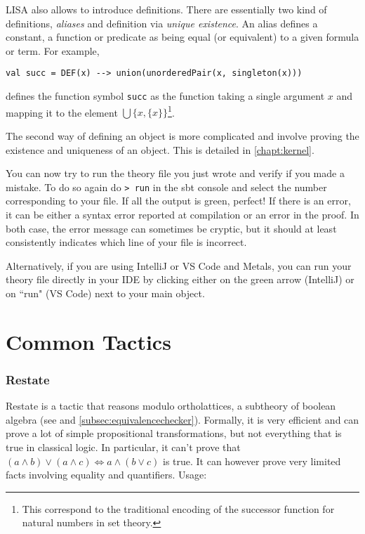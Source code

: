 LISA also allows to introduce definitions. There are essentially two kind of definitions, \emph{aliases} and definition via \emph{unique existence}.
An alias defines a constant, a function or predicate as being equal (or equivalent) to a given formula or term. For example,

\noindent\begin{minipage}{\linewidth}\vspace{1em}
  \begin{lstlisting}[language=lisa, frame=single]
  val succ = DEF(x) --> union(unorderedPair(x, singleton(x)))
  \end{lstlisting}
\end{minipage}
defines the function symbol \lstinline|succ| as the function taking a single argument $x$ and mapping it to the element $\bigcup \lbrace x, \lbrace x \rbrace \rbrace$\footnote{This correspond to the traditional encoding of the successor function for natural numbers in set theory.}.

The second way of defining an object is more complicated and involve proving the existence and uniqueness of an object. This is detailed in \autoref{chapt:kernel}.

You can now try to run the theory file you just wrote and verify if you made a mistake. To do so again do \lstinline|> run| in the sbt console and select the number corresponding to your file. 
If all the output is green, perfect! If there is an error, it can be either a syntax error reported at compilation or an error in the proof. In both case, the error message can sometimes be cryptic, but it should at least consistently indicates which line of your file is incorrect.

Alternatively, if you are using IntelliJ or VS Code and Metals, you can run your theory file directly in your IDE by clicking either on the green arrow (IntelliJ) or on ``run" (VS Code) next to your main object.


\section{Common Tactics}
\subsubsection*{Restate}
Restate is a tactic that reasons modulo ortholattices, a subtheory of boolean algebra (see \cite{guilloudFormulaNormalizationsVerification2023} and \autoref{subsec:equivalencechecker}). Formally, it is very efficient and can prove a lot of simple propositional transformations, but not everything that is true in classical logic. In particular, it can't prove that $(a\land b) \lor (a \land c) \iff a \land (b \lor c)$ is true. It can however prove very limited facts involving equality and quantifiers. Usage:

